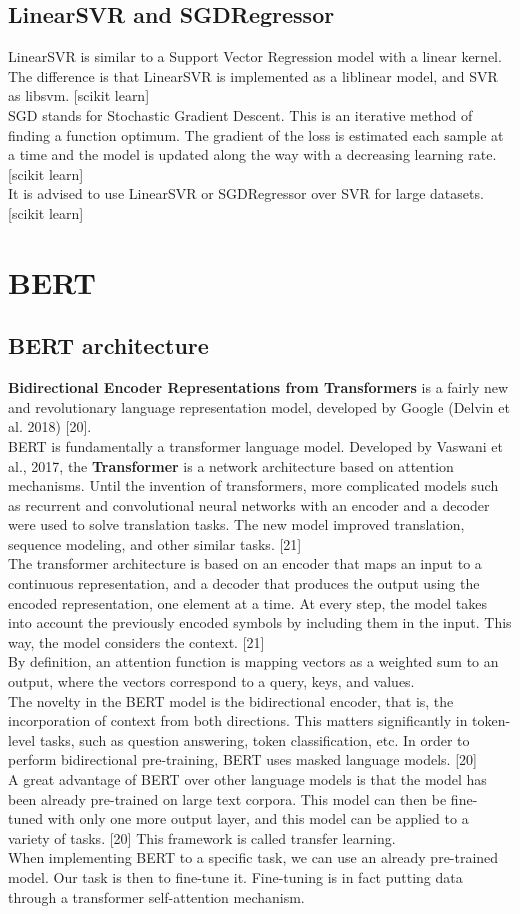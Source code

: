 \documentclass[times, utf8, zavrsni, english]{fer}
\begin{document}
\subsection{LinearSVR and SGDRegressor}
LinearSVR is similar to a Support Vector Regression model with a linear kernel. 
The difference is that LinearSVR is implemented as a liblinear model, and SVR as libsvm. [scikit learn] \\
SGD stands for Stochastic Gradient Descent. This is an iterative method of finding a function optimum. The gradient of the loss is estimated each sample at a time and the model is updated along the way with a decreasing learning rate. [scikit learn] \\
It is advised to use LinearSVR or SGDRegressor over SVR for large datasets. [scikit learn] 

\section{BERT}
\subsection{BERT architecture}
\textbf{Bidirectional Encoder Representations from Transformers} is a fairly new and revolutionary language representation model, developed by Google (Delvin et al. 2018) [20]. \\
BERT is fundamentally a transformer language model.
Developed by Vaswani et al., 2017, the \textbf{Transformer} is a network architecture based on attention mechanisms. Until the invention of transformers, more complicated models such as recurrent and convolutional neural networks with an encoder and a decoder were used to solve translation tasks. The new model improved translation, sequence modeling, and other similar tasks. [21] \\
The transformer architecture is based on an encoder that maps an input to a continuous representation, and a decoder that produces the output using the encoded representation, one element at a time. At every step, the model takes into account the previously encoded symbols by including them in the input. This way, the model considers the context. [21] \\
By definition, an attention function is mapping vectors as a weighted sum to an output, where the vectors correspond to a query, keys, and values. \\
The novelty in the BERT model is the bidirectional encoder, that is, the incorporation of context from both directions. This matters significantly in token-level tasks, such as question answering, token classification, etc. In order to perform bidirectional pre-training, BERT uses masked language models. [20] \\
A great advantage of BERT over other language models is that the model has been already pre-trained on large text corpora. This model can then be fine-tuned with only one more output layer, and this model can be applied to a variety of tasks. [20] This framework is called transfer learning. \\
When implementing BERT to a specific task, we can use an already pre-trained model. Our task is then to fine-tune it.
Fine-tuning is in fact putting data through a transformer self-attention mechanism.
\end{document}
